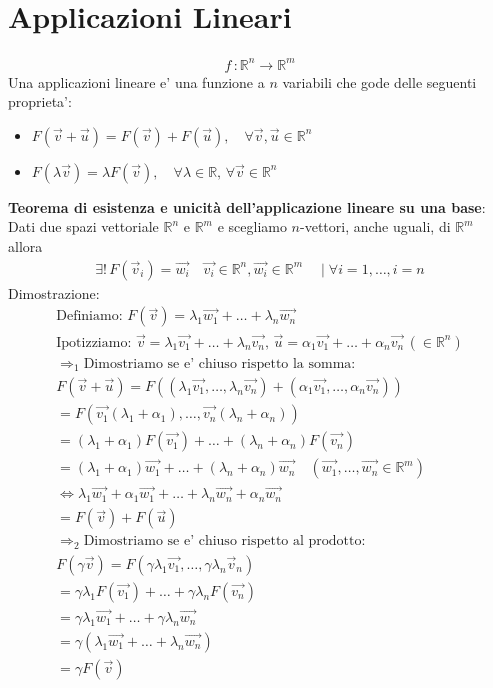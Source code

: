 \documentclass[10pt]{extarticle}
\begin{document}
\section{Applicazioni Lineari}
\begin{align*}
    f \, : \mathbb{R}^n \to \mathbb{R}^m
\end{align*}
Una applicazioni lineare e' una funzione a $n$ variabili che gode delle seguenti proprieta':
\begin{itemize}
    \item $F(\vec{v}+\vec{u})=F(\vec{v})+F(\vec{u}), \quad \forall \vec{v},\vec{u} \in \mathbb{R}^n$ 
    \item $F(\lambda\vec{v})=\lambda F(\vec{v}), \quad \forall \lambda \in \mathbb{R}, \, \forall \vec{v} \in \mathbb{R}^n $
\end{itemize}
\textbf{Teorema di esistenza e unicità dell'applicazione lineare su una base}: \\
Dati due spazi vettoriale $\mathbb{R}^n$ e $\mathbb{R}^m$ e scegliamo $n$-vettori, anche uguali, di $\mathbb{R}^m$ allora
\begin{align*}
    \exists! \, F(\vec{v}_i)=\vec{w_i} \quad \vec{v_i}\in \mathbb{R}^n, \vec{w_i}\in\mathbb{R}^m \quad \mid \forall i=1,\dots,i=n
\end{align*}
Dimostrazione:
\begin{align*}
    \text{Definiamo: } F(\vec{v})=\lambda_1\vec{w_1}+\dots+\lambda_n\vec{w_n}\\
   \text{Ipotizziamo: } \vec{v}=\lambda_1\vec{v_1}+\dots+\lambda_n\vec{v_n}, \, \vec{u}=\alpha_1\vec{v_1}+\dots+ \alpha_n\vec{v_n} \,(\in \mathbb{R}^n)\\
   \Rightarrow_1 \text{Dimostriamo se e' chiuso rispetto la somma}: \\
   F(\vec{v}+\vec{u})=F((\lambda_1\vec{v_1},\dots,\lambda_n\vec{v_n})+(\alpha_1\vec{v_1},\dots,\alpha_n\vec{v_n})) \\
   =F(\vec{v_1}(\lambda_1+\alpha_1),\dots,\vec{v_n}(\lambda_n+\alpha_n))\\
   =(\lambda_1+\alpha_1)F(\vec{v_1})+\dots+(\lambda_n+\alpha_n)F(\vec{v_n}) \\
   =(\lambda_1+\alpha_1)\vec{w_1}+\dots+(\lambda_n+\alpha_n)\vec{w_n} \quad (\vec{w_1},\dots,\vec{w_n} \in \mathbb{R}^m)\\ 
   \iff \lambda_1\vec{w_1}+\alpha_1\vec{w_1}+\dots+\lambda_n\vec{w_n}+\alpha_n\vec{w_n} \\
   = F(\vec{v}) + F(\vec{u}) \\
    \Rightarrow_2 \text{Dimostriamo se e' chiuso rispetto al prodotto}: \\
    F(\gamma\vec{v})=F(\gamma\lambda_1\vec{v_1},\dots,\gamma\lambda_n \vec{v}_n)\\
    =\gamma\lambda_1F(\vec{v_1})+\dots+\gamma\lambda_nF(\vec{v_n})\\
    = \gamma\lambda_1\vec{w_1}+\dots+\gamma\lambda_n\vec{w_n} \\
    = \gamma (\lambda_1\vec{w_1}+\dots+\lambda_n\vec{w_n}) \\
    = \gamma F(\vec{v})
\end{align*}
\end{document}
